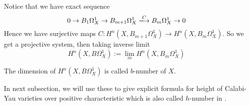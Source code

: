 Notice that we have exact sequence
\[
0 \to B_1 \Omega_X^1 \to B_{m+1} \Omega_X^1 \xlongrightarrow{C} B_{m} \Omega_X^1 \to 0
\]
Hence we have surjective maps $C: H^n(X,B_{m+1} \Omega_X^1) \to H^n(X,B_m \Omega_X^1)$. So we get a projective system, then taking inverse limit
\[
H^n(X,B \Omega_X^1):=\lim_m H^n(X,B_m \Omega_X^1)
\]
\begin{secdefn}
	 The dimension of $H^n(X,B \Omega_X^1)$ is called $b$-number of $X$.
\end{secdefn}
In next subsection, we will use these to give explicit formula for height of Calabi-Yau varieties over positive characteristic which is also called $h$-number in \cite{}.